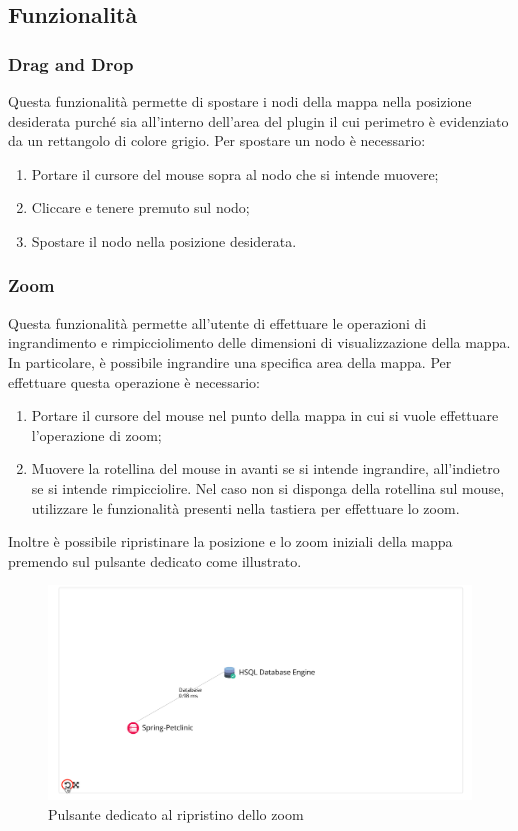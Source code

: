 \subsection{Funzionalità}
	\subsubsection {Drag and Drop} 
Questa funzionalità permette di spostare i nodi della mappa nella posizione desiderata purché sia all'interno dell'area del plugin il cui perimetro è evidenziato da un rettangolo di colore grigio.
Per spostare un nodo è necessario: 
\begin{enumerate}
	\item Portare il cursore del mouse sopra al nodo che si intende muovere;
	\item Cliccare e tenere premuto sul nodo;
	\item Spostare il nodo nella posizione desiderata.
\end{enumerate}


\subsubsection{Zoom}
Questa funzionalità permette all'utente di effettuare le operazioni di ingrandimento e rimpicciolimento delle dimensioni di visualizzazione della mappa. In particolare, è possibile ingrandire una specifica area della mappa.
Per effettuare questa operazione è necessario:
\begin{enumerate}
	\item Portare il cursore del mouse nel punto della mappa in cui si vuole effettuare l'operazione di zoom;
	\item Muovere la rotellina del mouse in avanti se si intende ingrandire, all'indietro se si intende rimpicciolire. Nel caso non si disponga della rotellina sul mouse, utilizzare le funzionalità presenti nella tastiera per effettuare lo zoom.
\end{enumerate}
Inoltre è possibile ripristinare la posizione e lo zoom iniziali della mappa premendo sul pulsante dedicato come illustrato.
\begin{figure}[H]
	\centering 
	\includegraphics[width=1\textwidth]{Images/zoom}
	\caption{Pulsante dedicato al ripristino dello zoom}
\end{figure}

